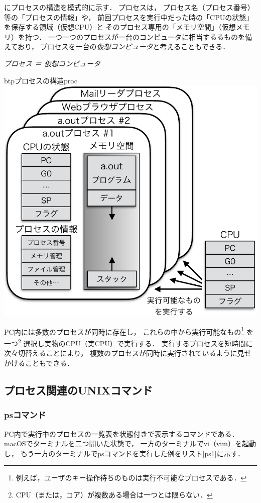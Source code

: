 にプロセスの構造を模式的に示す．
プロセスは，
プロセス名（プロセス番号）等の「プロセスの情報」や，
前回プロセスを実行中だった時の「CPUの状態」を保存する領域（仮想CPU）と
そのプロセス専用の「メモリ空間」（仮想メモリ）を持つ．
一つ一つのプロセスが一台のコンピュータに相当するるものを備えており，
プロセスを一台の\emph{仮想コンピュータ}と考えることもできる．

\begin{center}
\emph{\Large プロセス ＝ 仮想コンピュータ}
\end{center}


\begin{myfig}{btp}{プロセスの構造}{proc}
  \includegraphics[scale=0.7]{Fig/proc-crop.pdf}
\end{myfig}

PC内には多数のプロセスが同時に存在し，
これらの中から実行可能なもの\footnote{
例えば，ユーザのキー操作待ちのものは実行不可能なプロセスである．}
を一つ\footnote{CPU（または，コア）が複数ある場合は一つとは限らない．}
選択し実物のCPU（実CPU）で実行する．
実行するプロセスを短時間に次々切替えることにより，
複数のプロセスが同時に実行されているように見せかけることもできる．

\subsection{プロセス関連のUNIXコマンド}

\subsubsection{psコマンド}
PC内で実行中のプロセスの一覧表を状態付きで表示するコマンドである．
macOSでターミナルを二つ開いた状態で，
一方のターミナルでvi（vim）を起動し，
もう一方のターミナルでpsコマンドを実行した例をリスト\ref{ps1}に示す．

